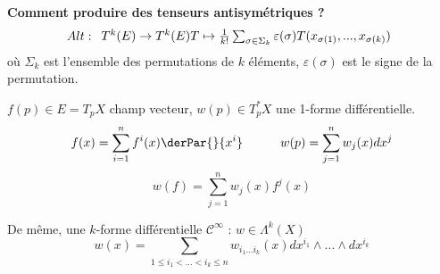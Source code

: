\textbf{Comment produire des tenseurs antisymétriques ?}\\
\[Alt :\begin{array}{c c c}
	T^k(E)\to T^k(E)
	T\mapsto \frac{1}{k!} \sum_{\sigma\in\Sigma_k} \varepsilon(\sigma) T(x_{\sigma(1)},...,x_{\sigma(k)})
\end{array}\]
où $\Sigma_k$ est l'ensemble des permutations de $k$ éléments, $\varepsilon(\sigma)$ est le signe de la permutation.







$f(p)\in E=T_pX$ champ vecteur, $w(p)\in T^*_p X$ une 1-forme différentielle.
\[f(x)=\sum_{i=1}^n f^i(x) \derPar{}{x^i} \hspace{3em} w(p)=\sum_{j=1}^n w_j(x) dx^j\]
\[w(f)=\sum_{j=1}^n w_j(x)f^j(x)\]

De même, une $k$-forme différentielle $\mathcal{C}^\infty$ : $w\in\Lambda^k(X)$
\[w(x)=\sum_{1\leq i_1<...<i_k\leq n} w_{i_1...i_k}(x)dx^{i_1}\wedge...\wedge dx^{i_k}\]

